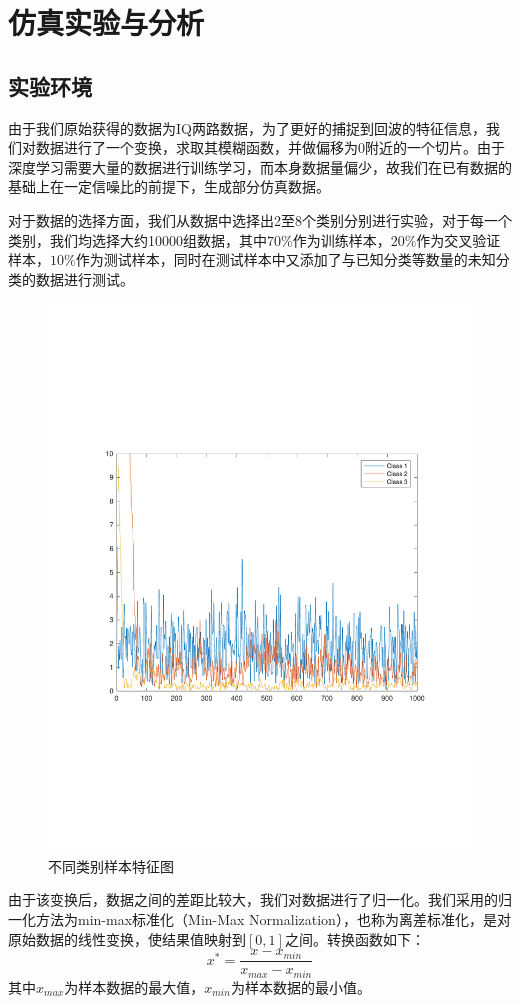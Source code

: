 \section{仿真实验与分析}
\subsection{实验环境}
由于我们原始获得的数据为IQ两路数据，为了更好的捕捉到回波的特征信息，我们对数据进行了一个变换，求取其模糊函数，并做偏移为0附近的一个切片。由于深度学习需要大量的数据进行训练学习，而本身数据量偏少，故我们在已有数据的基础上在一定信噪比的前提下，生成部分仿真数据。

对于数据的选择方面，我们从数据中选择出2至8个类别分别进行实验，对于每一个类别，我们均选择大约10000组数据，其中$70\%$作为训练样本，$20\%$作为交叉验证样本，$10\%$作为测试样本，同时在测试样本中又添加了与已知分类等数量的未知分类的数据进行测试。
\begin{figure}
	\centering
	\includegraphics[width=\textwidth]{figures/diff_data.pdf}
	\caption{不同类别样本特征图}
\end{figure}
由于该变换后，数据之间的差距比较大，我们对数据进行了归一化。我们采用的归一化方法为min-max标准化（Min-Max Normalization），也称为离差标准化，是对原始数据的线性变换，使结果值映射到$[0 , 1]$之间。转换函数如下：
\begin{equation}
x^{*}=\frac{x-x_{min}}{x_{max}-x_{min}}
\end{equation}
其中$x_{max}$为样本数据的最大值，$x_{min}$为样本数据的最小值。

